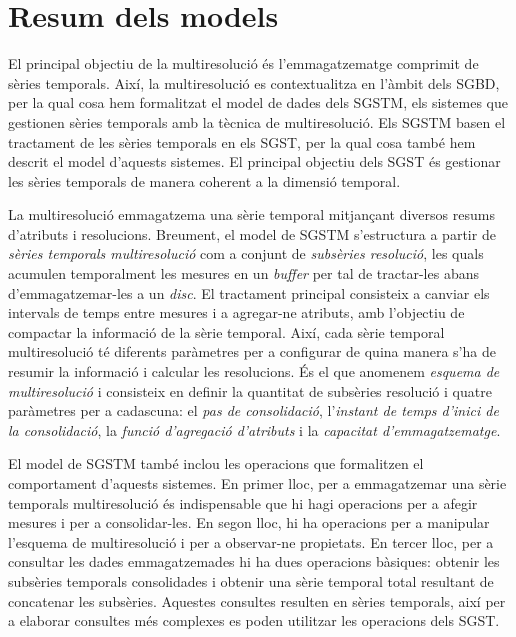 \section{Resum dels models}


El principal objectiu de la multiresolució és l'emmagatzematge
comprimit de sèries temporals. Així, la multiresolució es
contextualitza en l'àmbit dels \gls{SGBD}, per la qual cosa hem
formalitzat el model de dades dels \gls{SGSTM}, els sistemes que
gestionen sèries temporals amb la tècnica de multiresolució. Els
\gls{SGSTM} basen el tractament de les sèries temporals en els
\gls{SGST}, per la qual cosa també hem descrit el model d'aquests
sistemes. El principal objectiu dels \gls{SGST} és gestionar les
sèries temporals de manera coherent a la dimensió temporal.



La multiresolució emmagatzema una sèrie temporal mitjançant diversos
resums d'atributs i resolucions.  Breument, el model de \gls{SGSTM}
s'estructura a partir de \emph{sèries temporals multiresolució} com a
conjunt de \emph{subsèries resolució}, les quals acumulen temporalment
les mesures en un \emph{buffer} per tal de tractar-les abans
d'emmagatzemar-les a un \emph{disc}. El tractament principal
consisteix a canviar els intervals de temps entre mesures i a
agregar-ne atributs, amb l'objectiu de compactar la informació de la
sèrie temporal.  Així, cada sèrie temporal multiresolució té diferents
paràmetres per a configurar de quina manera s'ha de resumir la
informació i calcular les resolucions. És el que anomenem
\emph{esquema de multiresolució} i consisteix en definir la quantitat
de subsèries resolució i quatre paràmetres per a cadascuna: el
\emph{pas de consolidació}, l'\emph{instant de temps d'inici de la
  consolidació}, la \emph{funció d'agregació d'atributs} i la
\emph{capacitat d'emmagatzematge}.



El model de \gls{SGSTM} també inclou les operacions que formalitzen el
comportament d'aquests sistemes. En primer lloc, per a emmagatzemar
una sèrie temporals multiresolució és indispensable que hi hagi
operacions per a afegir mesures i per a consolidar-les. En segon lloc,
hi ha operacions per a manipular l'esquema de multiresolució i per a
observar-ne propietats. En tercer lloc, per a consultar les dades
emmagatzemades hi ha dues operacions bàsiques: obtenir les subsèries
temporals consolidades i obtenir una sèrie temporal total resultant de
concatenar les subsèries. Aquestes consultes resulten en sèries
temporals, així per a elaborar consultes més complexes es poden
utilitzar les operacions dels \gls{SGST}.



